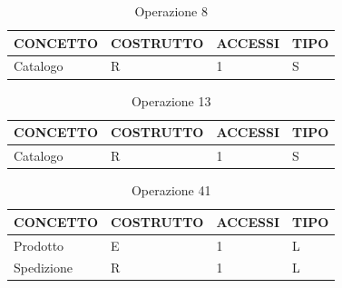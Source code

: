 \begin{table}[H]
\centering
\caption{Operazione 8}
\begin{tabular}{llll}
\\ \hline
\multicolumn{1}{|l|}{\textbf{CONCETTO}} & \multicolumn{1}{l|}{\textbf{COSTRUTTO}} & \multicolumn{1}{l|}{\textbf{ACCESSI}} & \multicolumn{1}{l|}{\textbf{TIPO}} \\ \hline
\multicolumn{1}{|l|}{Catalogo}
& \multicolumn{1}{l|}{R}                  & \multicolumn{1}{l|}{1}                & \multicolumn{1}{l|}{S}             \\ \hline
\end{tabular}
\end{table}

\begin{table}[H]
\centering
\caption{Operazione 13}
\begin{tabular}{llll}
\\ \hline
\multicolumn{1}{|l|}{\textbf{CONCETTO}} & \multicolumn{1}{l|}{\textbf{COSTRUTTO}} & \multicolumn{1}{l|}{\textbf{ACCESSI}} & \multicolumn{1}{l|}{\textbf{TIPO}} \\ \hline
\multicolumn{1}{|l|}{Catalogo}
& \multicolumn{1}{l|}{R}                  & \multicolumn{1}{l|}{1}                & \multicolumn{1}{l|}{S}             \\ \hline
\end{tabular}
\end{table}


\begin{table}[H]
\centering
\caption{Operazione 41}
\begin{tabular}{llll}
\\ \hline
\multicolumn{1}{|l|}{\textbf{CONCETTO}} & \multicolumn{1}{l|}{\textbf{COSTRUTTO}} & \multicolumn{1}{l|}{\textbf{ACCESSI}} & \multicolumn{1}{l|}{\textbf{TIPO}} \\ \hline
\multicolumn{1}{|l|}{Prodotto}             & \multicolumn{1}{l|}{E}                  & \multicolumn{1}{l|}{1}        
& \multicolumn{1}{l|}{L}             
			 \\ \hline
\multicolumn{1}{|l|}{Spedizione}
& \multicolumn{1}{l|}{R}                  & \multicolumn{1}{l|}{1}                & \multicolumn{1}{l|}{L}             \\ \hline
\end{tabular}
\end{table}



